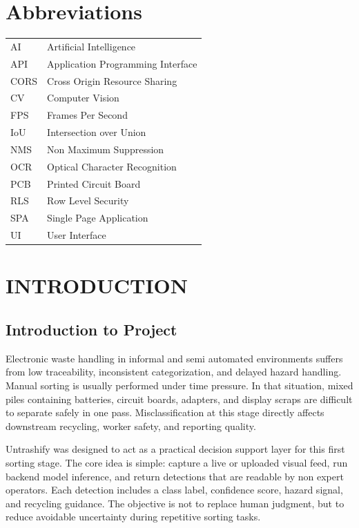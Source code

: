 \documentclass[12pt,a4paper]{report}
\begin{document}
\tableofcontents
\listoffigures
\listoftables
\newpage

\chapter*{Abbreviations}
\begin{longtable}{p{}p{}}
AI & Artificial Intelligence \\
API & Application Programming Interface \\
CORS & Cross Origin Resource Sharing \\
CV & Computer Vision \\
FPS & Frames Per Second \\
IoU & Intersection over Union \\
NMS & Non Maximum Suppression \\
OCR & Optical Character Recognition \\
PCB & Printed Circuit Board \\
RLS & Row Level Security \\
SPA & Single Page Application \\
UI & User Interface \\
\end{longtable}

\cleardoublepage
{}

\chapter{INTRODUCTION}
\section{Introduction to Project}
Electronic waste handling in informal and semi automated environments suffers from low traceability, inconsistent categorization, and delayed hazard handling. Manual sorting is usually performed under time pressure. In that situation, mixed piles containing batteries, circuit boards, adapters, and display scraps are difficult to separate safely in one pass. Misclassification at this stage directly affects downstream recycling, worker safety, and reporting quality.

Untrashify was designed to act as a practical decision support layer for this first sorting stage. The core idea is simple: capture a live or uploaded visual feed, run backend model inference, and return detections that are readable by non expert operators. Each detection includes a class label, confidence score, hazard signal, and recycling guidance. The objective is not to replace human judgment, but to reduce avoidable uncertainty during repetitive sorting tasks.
\end{document}
